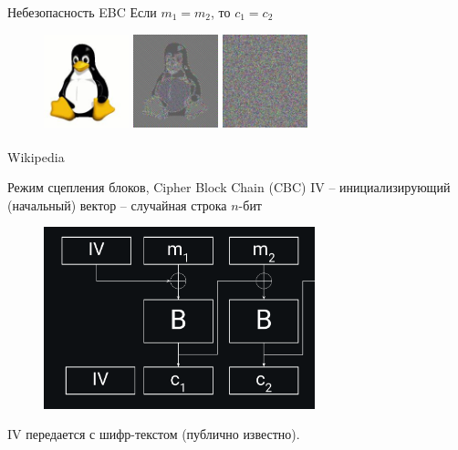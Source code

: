 \documentclass[usenames,dvipsnames,8pt,aspectratio=169]{beamer}
\begin{document}
\begin{frame}{Небезопасность EBC}
\centering
\Huge Если $m_1 = m_2$, то $c_1 = c_2$ \\[20pt]
\large
\begin{figure}
\includegraphics[width=0.22\textwidth]{Tux} \quad 
\includegraphics[width=0.22\textwidth]{Tux_ecb} \quad 
\includegraphics[width=0.22\textwidth]{Tux_secure}
\end{figure}

\vfill
\small
{\color{gray} \textsuperscript{\textcopyright} Wikipedia} 
\end{frame}

\begin{frame}{Режим сцепления блоков, Cipher Block Chain (CBC)}
\Large
{\color{Orange} IV} -- инициализирующий (начальный) вектор -- случайная строка $n$-бит

\begin{figure}
\includegraphics[width=0.7\textwidth]{CBC}
\end{figure}
IV передается с шифр-текстом (публично известно).
\end{frame}
\end{document}
